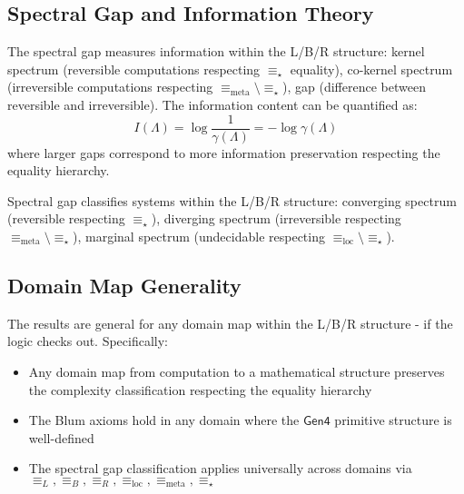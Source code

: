 \subsection{Spectral Gap and Information Theory}

\begin{definition}
\label{def:spectral-gap-info-lbr}
The spectral gap measures information within the L/B/R structure: kernel spectrum (reversible computations respecting $\equiv_\star$ equality), co-kernel spectrum (irreversible computations respecting $\equiv_{\text{meta}} \setminus \equiv_\star$), gap (difference between reversible and irreversible). The information content can be quantified as:
\[
I(\Lambda) = \log \frac{1}{\gamma(\Lambda)} = -\log \gamma(\Lambda)
\]
where larger gaps correspond to more information preservation respecting the equality hierarchy.
\end{definition}

\begin{theorem}
\label{thm:info-classification-lbr}
Spectral gap classifies systems within the L/B/R structure: converging spectrum (reversible respecting $\equiv_\star$), diverging spectrum (irreversible respecting $\equiv_{\text{meta}} \setminus \equiv_\star$), marginal spectrum (undecidable respecting $\equiv_{\text{loc}} \setminus \equiv_\star$).
\end{theorem}

\subsection{Domain Map Generality}

\begin{theorem}
\label{thm:domain-generality-spectral-lbr}
The results are general for any domain map within the L/B/R structure - if the logic checks out. Specifically:
\begin{itemize}
\item Any domain map from computation to a mathematical structure preserves the complexity classification respecting the equality hierarchy
\item The Blum axioms hold in any domain where the $\mathsf{Gen4}$ primitive structure is well-defined
\item The spectral gap classification applies universally across domains via $\equiv_L, \equiv_B, \equiv_R, \equiv_{\text{loc}}, \equiv_{\text{meta}}, \equiv_\star$
\end{itemize}
\end{theorem}

